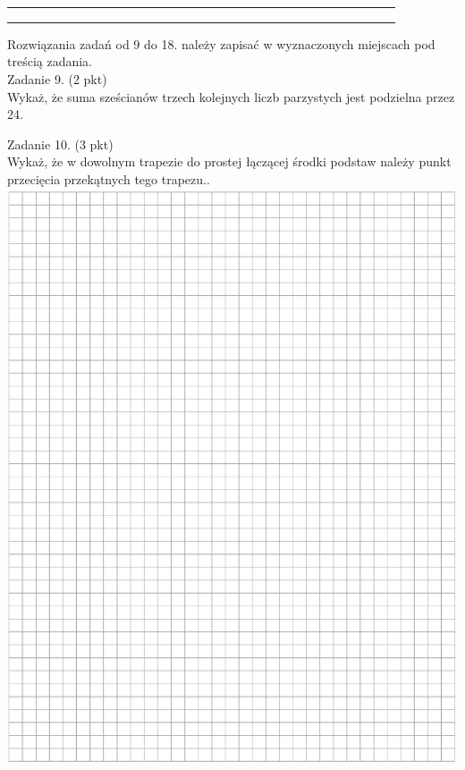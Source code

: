 \documentclass[10pt]{article}
\begin{document}
\begin{center}
\begin{tabular}{|c|c|c|c|c|c|c|c|c|c|c|c|c|c|c|c|c|c|c|c|c|c|c|c|c|c|c|c|c|c|c|}
\hline
 &  &  &  &  &  &  &  &  &  &  &  &  &  &  &  &  &  &  &  &  &  &  &  &  &  &  &  &  &  &  \\
\hline
 &  &  &  &  &  &  &  &  &  &  &  &  &  &  &  &  &  &  &  &  &  &  &  &  &  &  &  &  &  &  \\
\hline
 &  &  &  &  &  &  &  &  &  &  &  &  &  &  &  &  &  &  &  &  &  &  &  &  &  &  &  &  &  &  \\
\hline
 &  &  &  &  &  &  &  &  &  &  &  &  &  &  &  &  &  &  &  &  &  &  &  &  &  &  &  &  &  &  \\
\hline
\end{tabular}
\end{center}

Rozwiązania zadań od 9 do 18. należy zapisać w wyznaczonych miejscach pod treścią zadania.\\
Zadanie 9. (2 pkt)\\
Wykaż, że suma sześcianów trzech kolejnych liczb parzystych jest podzielna przez 24.

Zadanie 10. (3 pkt)\\
Wykaż, że w dowolnym trapezie do prostej łączącej środki podstaw należy punkt przecięcia przekątnych tego trapezu..\\
\includegraphics[max width=\textwidth, center]{2024_11_21_caad0d2d07cc5c30818fg-08}
\end{document}
